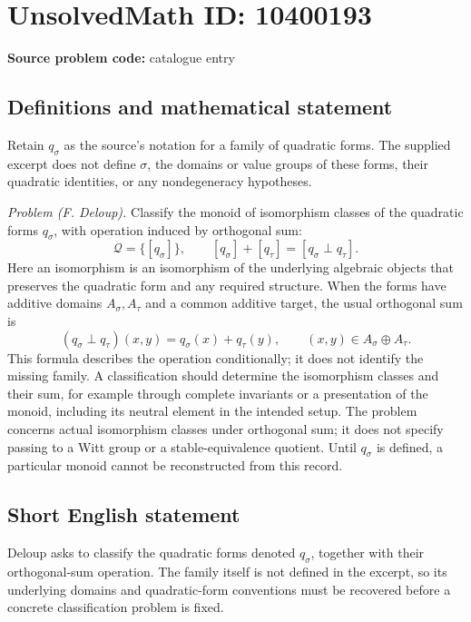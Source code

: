 \documentclass[11pt]{article}
\begin{document}
\section*{UnsolvedMath ID: 10400193}
\textbf{Source problem code:} catalogue entry
\subsection{Definitions and mathematical statement}
Retain \(q_\sigma\) as the source's notation for a family of quadratic forms. The supplied excerpt does not define \(\sigma\), the domains or value groups of these forms, their quadratic identities, or any nondegeneracy hypotheses.

\emph{Problem (F. Deloup).} Classify the monoid of isomorphism classes of the quadratic forms \(q_\sigma\), with operation induced by orthogonal sum:
\[
 \mathcal Q=\{[q_\sigma]\},\qquad
 [q_\sigma]+[q_\tau]=[q_\sigma\perp q_\tau].
\]
Here an isomorphism is an isomorphism of the underlying algebraic objects that preserves the quadratic form and any required structure. When the forms have additive domains \(A_\sigma,A_\tau\) and a common additive target, the usual orthogonal sum is
\[
 (q_\sigma\perp q_\tau)(x,y)=q_\sigma(x)+q_\tau(y),
 \qquad(x,y)\in A_\sigma\oplus A_\tau.
\]
This formula describes the operation conditionally; it does not identify the missing family. A classification should determine the isomorphism classes and their sum, for example through complete invariants or a presentation of the monoid, including its neutral element in the intended setup. The problem concerns actual isomorphism classes under orthogonal sum; it does not specify passing to a Witt group or a stable-equivalence quotient. Until \(q_\sigma\) is defined, a particular monoid cannot be reconstructed from this record.
\subsection{Short English statement}
Deloup asks to classify the quadratic forms denoted \(q_\sigma\), together with their orthogonal-sum operation. The family itself is not defined in the excerpt, so its underlying domains and quadratic-form conventions must be recovered before a concrete classification problem is fixed.
\end{document}
